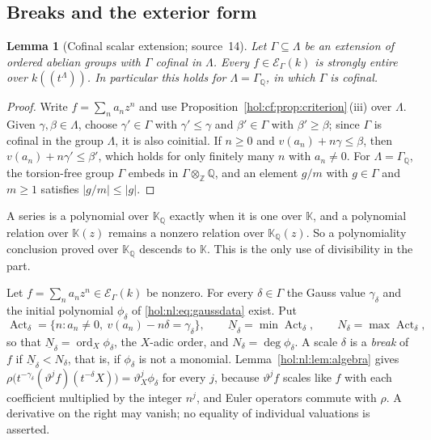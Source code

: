 \documentclass[11pt]{article}
\numberwithin{equation}{section}
\newtheorem{lemma}[theorem]{Lemma}
\theoremstyle{definition}
\theoremstyle{remark}
\newcommand{\Q}{\mathbb Q}
\newcommand{\Z}{\mathbb Z}
\newcommand{\abs}[1]{\lvert#1\rvert}
\newcommand{\KK}{\mathbb K}
\newcommand{\EK}{\mathcal E_\Gamma(k)}
\begin{document}
\subsection{Breaks and the exterior form}\label{hol:ot:sub:breaks}

\begin{lemma}[Cofinal scalar extension; source~14]\label{hol:ot:lem:extension}
Let $\Gamma\subseteq\Lambda$ be an extension of ordered abelian groups with
$\Gamma$ cofinal in $\Lambda$. Every $f\in\EK$ is strongly entire over
$k((t^\Lambda))$. In particular this holds for $\Lambda=\Gamma_\Q$, in which
$\Gamma$ is cofinal.
\end{lemma}

\begin{proof}
Write $f=\sum_na_nz^n$ and use Proposition~\ref{hol:cf:prop:criterion}\,(iii)
over $\Lambda$. Given $\gamma,\beta\in\Lambda$, choose $\gamma'\in\Gamma$ with
$\gamma'\le\gamma$ and $\beta'\in\Gamma$ with $\beta'\ge\beta$; since $\Gamma$
is cofinal in the group $\Lambda$, it is also coinitial. If $n\ge0$ and
$v(a_n)+n\gamma\le\beta$, then $v(a_n)+n\gamma'\le\beta'$, which holds for only
finitely many $n$ with $a_n\ne0$. For $\Lambda=\Gamma_\Q$, the torsion-free
group $\Gamma$ embeds in $\Gamma\otimes_\Z\Q$, and an element $g/m$ with
$g\in\Gamma$ and $m\ge1$ satisfies $\abs{g/m}\le\abs g$.
\end{proof}

A series is a polynomial over $\KK_\Q$ exactly when it is one over $\KK$, and
a polynomial relation over $\KK(z)$ remains a nonzero relation over
$\KK_\Q(z)$. So a polynomiality conclusion proved over $\KK_\Q$ descends to
$\KK$. This is the only use of divisibility in the part.

Let $f=\sum_na_nz^n\in\EK$ be nonzero. For every $\delta\in\Gamma$ the Gauss
value $\gamma_\delta$ and the initial polynomial $\phi_\delta$ of
\eqref{hol:nl:eq:gaussdata} exist. Put
\begin{equation}\label{hol:ot:eq:active}
 \operatorname{Act}_\delta=\{n:a_n\ne0,\ v(a_n)-n\delta=\gamma_\delta\},\qquad
 \underline N_\delta=\min\operatorname{Act}_\delta,\qquad
 N_\delta=\max\operatorname{Act}_\delta ,
\end{equation}
so that $\underline N_\delta=\operatorname{ord}_X\phi_\delta$, the $X$-adic order, and
$N_\delta=\deg\phi_\delta$. A scale $\delta$ is a \emph{break} of $f$ if
$\underline N_\delta<N_\delta$, that is, if $\phi_\delta$ is not a monomial.
Lemma~\ref{hol:nl:lem:algebra} gives
$\rho\bigl(t^{-\gamma_\delta}(\vartheta^jf)(t^{-\delta}X)\bigr)
=\vartheta_X^j\phi_\delta$ for every $j$, because $\vartheta^jf$ scales like
$f$ with each coefficient multiplied by the integer $n^j$, and Euler
operators commute with $\rho$. A derivative on the right may vanish; no
equality of individual valuations is asserted.
\end{document}
